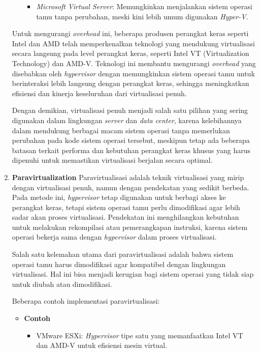 \documentclass[12pt]{article}
\begin{document}
\begin{enumerate}
\begin{itemize}
\begin{itemize}
            \item \textit{Microsoft Virtual Server}: Memungkinkan menjalankan sistem operasi tamu tanpa perubahan, meski kini lebih umum digunakan \textit{Hyper-V}.
        \end{itemize}
    \end{itemize}
    Untuk mengurangi \textit{overhead} ini, beberapa produsen perangkat keras seperti Intel dan AMD telah memperkenalkan teknologi yang mendukung virtualisasi secara langsung pada level perangkat keras, seperti Intel VT (Virtualization Technology) dan AMD-V. Teknologi ini membantu mengurangi \textit{overhead} yang disebabkan oleh \textit{hypervisor} dengan memungkinkan sistem operasi tamu untuk berinteraksi lebih langsung dengan perangkat keras, sehingga meningkatkan efisiensi dan kinerja keseluruhan dari virtualisasi penuh.
    
    \par Dengan demikian, virtualisasi penuh menjadi salah satu pilihan yang sering digunakan dalam lingkungan \textit{server} dan \textit{data center}, karena kelebihannya dalam mendukung berbagai macam sistem operasi tanpa memerlukan perubahan pada kode sistem operasi tersebut, meskipun tetap ada beberapa batasan terkait performa dan kebutuhan perangkat keras khusus yang harus dipenuhi untuk memastikan virtualisasi berjalan secara optimal.

    \item \textbf{Paravirtualization}
    \newline Paravirtualisasi adalah teknik virtualisasi yang mirip dengan virtualisasi penuh, namun dengan pendekatan yang sedikit berbeda. Pada metode ini, \textit{hypervisor} tetap digunakan untuk berbagi akses ke perangkat keras, tetapi sistem operasi tamu perlu dimodifikasi agar lebih sadar akan proses virtualisasi. Pendekatan ini menghilangkan kebutuhan untuk melakukan rekompilasi atau pemerangkapan instruksi, karena sistem operasi bekerja sama dengan \textit{hypervisor} dalam proses virtualisasi.

    \par Salah satu kelemahan utama dari paravirtualisasi adalah bahwa sistem operasi tamu harus dimodifikasi agar kompatibel dengan lingkungan virtualisasi. Hal ini bisa menjadi kerugian bagi sistem operasi yang tidak siap untuk diubah atau dimodifikasi. 
    
    \par Beberapa contoh implementasi paravirtualisasi:
    \begin{itemize}
        \item \textbf{Contoh}
        \begin{itemize}
            \item VMware ESXi: \textit{Hypervisor} tipe satu yang memanfaatkan Intel VT dan AMD-V untuk efisiensi mesin virtual.


\end{itemize}
\end{itemize}
\end{enumerate}
\end{document}
